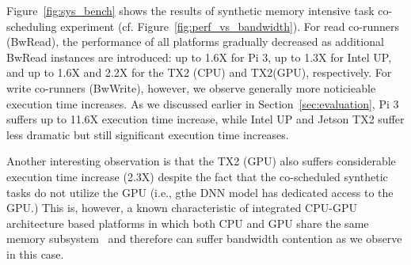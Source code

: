 Figure~\ref{fig:sys_bench} shows the results of synthetic memory
intensive task co-scheduling experiment
(cf. Figure~\ref{fig:perf_vs_bandwidth}).
For read co-runners (BwRead), the performance of all platforms
gradually decreased as additional BwRead instances are introduced: up
to 1.6X for Pi 3, up to 1.3X for Intel UP, and up to 1.6X and 2.2X for
the TX2 (CPU) and TX2(GPU), respectively.
For write co-runners (BwWrite), however, we observe generally more
noticieable execution time increases. As we discussed
earlier in Section~\ref{sec:evaluation}, Pi 3 suffers up to 11.6X
execution time increase, while Intel UP and Jetson TX2 suffer less
dramatic but still significant execution time increases.


Another interesting observation is that the TX2 (GPU) also suffers
considerable execution time increase (2.3X) despite the fact that the
co-scheduled synthetic tasks do not utilize the GPU (i.e., gthe DNN
model has dedicated access to the GPU.) This is, however, a 
known characteristic of integrated CPU-GPU architecture based
platforms in which both CPU and GPU share the same memory
subsystem~\cite{Ali2017} and therefore can suffer bandwidth contention
as we observe in this case.



